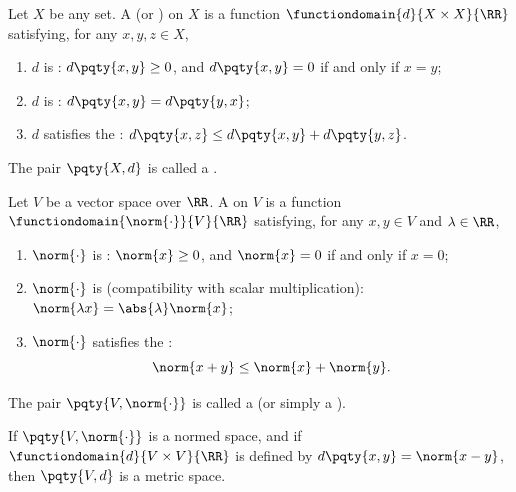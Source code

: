 \begin{definition}
    Let \(X\) be any set. A  (or ) on \(X\) is a function \(\functiondomain{d}{X \times X}{\RR}\) satisfying, for any \(x, y, z \in X\),
    \begin{enumerate}[label=(\roman*)]
        \item \(d\) is : \(d\pqty{x, y} \geq 0\), and \(d\pqty{x, y} = 0\) if and only if \(x = y\);
        \item \(d\) is : \(d\pqty{x, y} = d\pqty{y, x}\);
        \item \(d\) satisfies the : \(d\pqty{x, z} \leq d\pqty{x, y} + d\pqty{y, z}\).
    \end{enumerate}

    The pair \(\pqty{X, d}\) is called a .
\end{definition}

\begin{definition}
    Let \(V\) be a vector space over \(\RR\). A  on \(V\) is a function \(\functiondomain{\norm{\cdot}}{V}{\RR}\) satisfying, for any \(x, y \in V\) and \(\lambda \in \RR\),
    \begin{enumerate}[label=(\roman*)]
        \item \(\norm{\cdot}\) is : \(\norm{x} \geq 0\), and \(\norm{x} = 0\) if and only if \(x = 0\);
        \item \(\norm{\cdot}\) is  (compatibility with scalar multiplication): \(\norm{\lambda x} = \abs{\lambda} \norm{x}\);
        \item \(\norm{\cdot}\) satisfies the :
        \[
        \norm{x + y} \leq \norm{x} + \norm{y}.
        \]
    \end{enumerate}

    The pair \(\pqty{V, \norm{\cdot}}\) is called a  (or simply a ).
\end{definition}

\begin{proposition}
    \label{prop:normed-space-induces-metric-space}%
    If \(\pqty{V, \norm{\cdot}}\) is a normed space, and if \(\functiondomain{d}{V \times V}{\RR}\) is defined by \(d\pqty{x, y} = \norm{x - y}\), then \(\pqty{V, d}\) is a metric space.
\end{proposition}

